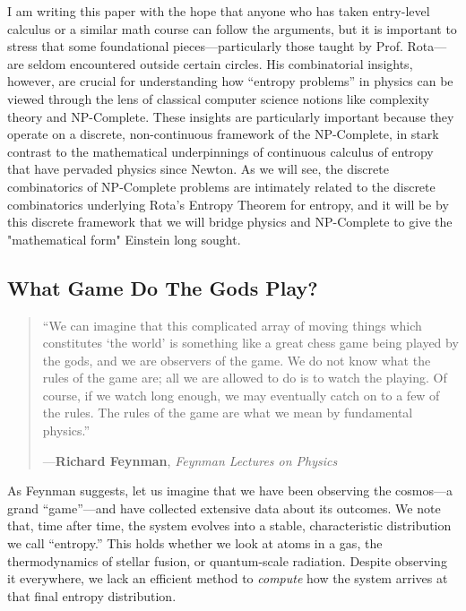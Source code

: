 \documentclass{report}
\begin{document}
I am writing this paper with the hope that anyone who has taken entry-level calculus or a similar math course can follow the arguments, but it is important to stress that some foundational pieces—particularly those taught by Prof. Rota—are seldom encountered outside certain circles. His combinatorial insights, however, are crucial for understanding how “entropy problems” in physics can be viewed through the lens of classical computer science notions like complexity theory and NP-Complete. These insights are particularly important because they operate on a discrete, non-continuous framework of the NP-Complete, in stark contrast to the mathematical underpinnings of continuous calculus of entropy that have pervaded physics since Newton. As we will see, the discrete combinatorics of NP-Complete problems are intimately related to the discrete combinatorics underlying Rota's Entropy Theorem for entropy, and it will be by this discrete framework that we will bridge physics and NP-Complete to give the "mathematical form" Einstein long sought.


\subsection*{What Game Do The Gods Play?}
\begin{quote}
    ``We can imagine that this complicated array of moving things which constitutes ‘the world’ is 
    something like a great chess game being played by the gods, and we are observers of the game. We 
    do not know what the rules of the game are; all we are allowed to do is to watch the playing. Of 
    course, if we watch long enough, we may eventually catch on to a few of the rules. The rules of 
    the game are what we mean by fundamental physics.''
  
    ---\textbf{Richard Feynman}, \emph{Feynman Lectures on Physics}\cite{FeynmanGameRules}
  \end{quote}
As Feynman suggests, let us imagine that we have been observing the cosmos—a grand “game”—and have collected extensive data about its outcomes. We note that, time after time, the system evolves into a stable, characteristic distribution we call “entropy.” This holds whether we look at atoms in a gas, the thermodynamics of stellar fusion, or quantum-scale radiation. Despite observing it everywhere, we lack an efficient method to \emph{compute} how the system arrives at that final entropy distribution.
\end{document}
